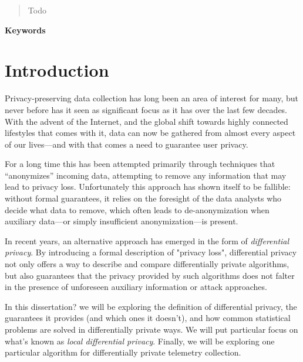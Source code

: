 


\newcommand{\todo}[1]{{\color{red}#1}}





\renewcommand{\abstractname}{Abstract}
\begin{abstract}
\todo{Todo}
\end{abstract}

\begin{center} \bf Keywords \end{center}

\thispagestyle{empty}
\tableofcontents
\newpage

\section{Introduction}

Privacy-preserving data collection has long been an area of interest for many, but never before has it seen as significant focus as it has over the last few decades. With the advent of the Internet, and the global shift towards highly connected lifestyles that comes with it, data can now be gathered from almost every aspect of our lives---and with that comes a need to guarantee user privacy.

For a long time this has been attempted primarily through techniques that ``anonymizes'' incoming data, attempting to remove any information that may lead to privacy loss. Unfortunately this approach has shown itself to be fallible: without formal guarantees, it relies on the foresight of the data analysts who decide what data to remove, which often leads to de-anonymization when auxiliary data---or simply insufficient anonymization---is present.

\bigskip

In recent years, an alternative approach has emerged in the form of \emph{differential privacy}. By introducing a formal description of "privacy loss", differential privacy not only offers a way to describe and compare differentially private algorithms, but also guarantees that the privacy provided by such algorithms does not falter in the presence of unforeseen auxiliary information or attack approaches.

In this \todo{dissertation?} we will be exploring the definition of differential privacy, the guarantees it provides (and which ones it doesn't), and how common statistical problems are solved in differentially private ways. We will put particular focus on what's known as \emph{local differential privacy}. Finally, we will be exploring one particular algorithm for differentially private telemetry collection.


